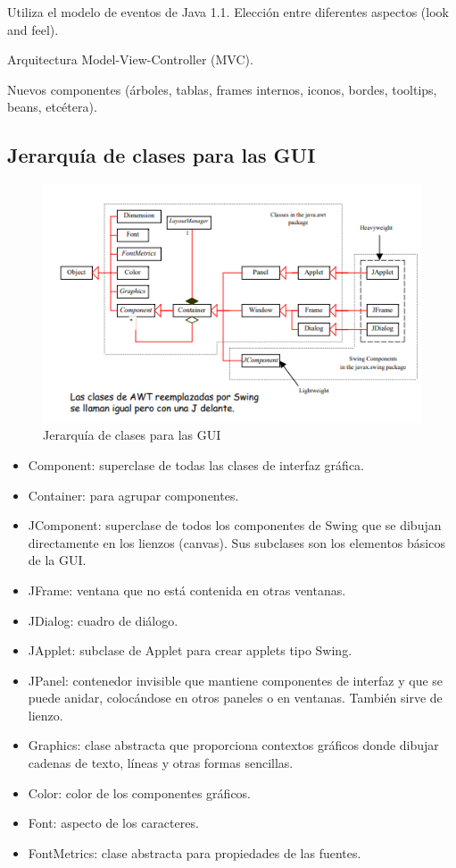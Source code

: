 \documentclass[12pt,a4paper]{report}
\begin{document}
{Utiliza el modelo de eventos de Java 1.1. Elección entre diferentes aspectos (look and feel). 

Arquitectura Model-View-Controller (MVC). 

Nuevos componentes (árboles, tablas, frames internos, iconos, bordes, tooltips, beans, etcétera).
\subsection*{Jerarquía de clases para las GUI}

\begin{figure}[hbtp]
\caption{Jerarquía de clases para las GUI}
\centering
\includegraphics[scale=1]{Jerarquia.PNG}
\end{figure}

\begin{itemize}
\item Component: superclase de todas las clases de interfaz gráfica. 
\item Container: para agrupar componentes. 
\item JComponent: superclase de todos los componentes de Swing que se dibujan directamente en los lienzos (canvas). Sus subclases son los elementos básicos de la GUI. 
\item JFrame: ventana que no está contenida en otras ventanas. 
\item JDialog: cuadro de diálogo. 
\item JApplet: subclase de Applet para crear applets tipo Swing. 
\item JPanel: contenedor invisible que mantiene componentes de interfaz y que se puede anidar, colocándose en otros paneles o en ventanas. También sirve de lienzo. 
\item Graphics: clase abstracta que proporciona contextos gráficos donde dibujar cadenas de texto, líneas y otras formas sencillas.
\item Color: color de los componentes gráficos. 
\item Font: aspecto de los caracteres. 
\item FontMetrics: clase abstracta para propiedades de las fuentes.
\end{itemize}

}
\end{document}

